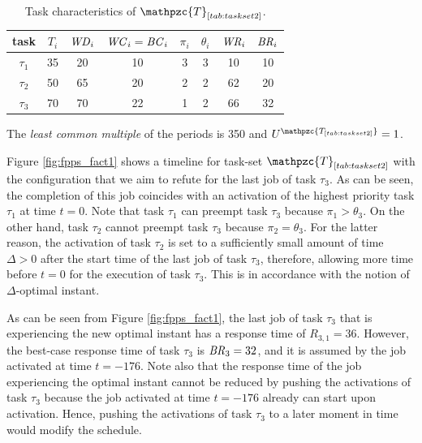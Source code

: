 \documentclass[conference,compsoc]{IEEEtran}
\newcommand{\bc}    {\mbox{\it BC}}
\newcommand{\br}    {\mbox{\it BR}}
\newcommand{\wc}    {\mbox{\it WC}}
\newcommand{\wcd}   {\mbox{\it WD}}
\renewcommand{\wr}  {\mbox{\it WR}}
\begin{document}

\begin{table}[h]
	\center
	\caption{Task characteristics of $\mathpzc{T}_{\ref{tab:taskset2}}$.}
	\label{tab:taskset2}
	\begin{tabular}{c | c c c c c | c c}
		\hline 
		task & $T_i$ & $\wcd_i$ & $\wc_i=\bc_i$ & $\pi_i$ & $\theta_i$ &  $\wr_i$ & $\br_i$\\ 
		\hline 
		$\tau_1$& 35 & 20 & 10 & 3 & 3 &  10 & 10\\ 
		$\tau_2$& 50 & 65 & 20 & 2 & 2 &  62 & 20\\ 
		$\tau_3$& 70 & 70 & 22 & 1 & 2 &  66 & 32\\
		\hline 
	\end{tabular}
	\small
	\item The \textit{least common multiple} of the periods is 350 and $U^{\mathpzc{T_{\ref{tab:taskset2}}}}=1$.
\end{table}

Figure \ref{fig:fpps_fact1} shows a timeline for task-set $\mathpzc{T}_{\ref{tab:taskset2}}$ with the configuration that we aim to refute for the last job of task $\tau_3$. As can be seen, the completion of this job coincides with an activation of the highest priority task $\tau_1$ at time $t=0$. Note that task $\tau_1$ can preempt task $\tau_3$ because $\pi_1 > \theta_3$. On the other hand, task $\tau_2$ cannot preempt task $\tau_3$ because $\pi_2 = \theta_3$. For the latter reason, the activation of task $\tau_2$ is set to a sufficiently small amount of time $\Delta>0$ after the start time of the last job of task $\tau_3$, therefore, allowing more time before $t=0$ for the execution of task $\tau_3$. This is in accordance with the notion of $\Delta$-optimal instant.


As can be seen from Figure \ref{fig:fpps_fact1}, the last job of task $\tau_3$ that is experiencing the new optimal instant has a response time of $R_{3,1}=36$. However, the best-case response time of task $\tau_3$ is $\br_3 = 32$, and it is assumed by the job activated at time $t=-176$. Note also that the response time of the job experiencing the optimal instant cannot be reduced by pushing the activations of task $\tau_3$ because the job activated at time $t=-176$ already can start upon activation. Hence, pushing the activations of task $\tau_3$ to a later moment in time would modify the schedule.
\end{document}
